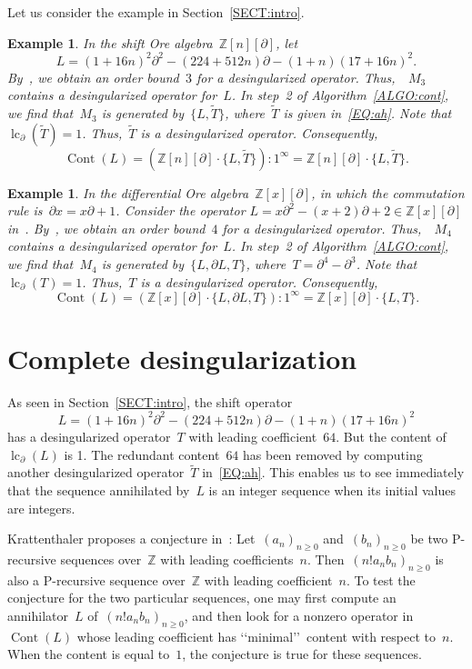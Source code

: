 \documentclass{sig-alternate}
\newcommand{\bZ} { {\mathbb{Z}}}
\newcommand{\cont}{\operatorname{Cont}}
\newcommand{\lc}{\operatorname{lc}}
\newcommand{\pa}{\partial}
\newtheorem{example}[theorem]{Example}
\begin{document}
Let us consider the example in Section~\ref{SECT:intro}.
\begin{example} \label{EX:ah}
In the shift Ore algebra~$\bZ[n][\pa]$, let
\[
 L = (1 + 16 n)^2 \pa^2 - (224 + 512 n) \pa - (1 + n)(17 + 16 n)^2.
\]
By~\cite[Lemma 4]{Chen2013}, we obtain an order bound~$3$ for a desingularized operator. Thus,~~$M_3$ contains a desingularized operator for~$L$.
In step~2 of  Algorithm~\ref{ALGO:cont}, we find that~$M_3$ is generated by~$\{L, \tilde{T} \}$, where~$\tilde T$ is given in~\eqref{EQ:ah}.
Note that~$\lc_{\pa}(\tilde{T}) {=} 1$. Thus,~$\tilde T$ is a desingularized operator.
Consequently,
$$\cont(L) = (\bZ[n][\pa] \cdot \{L, \tilde{T} \}   ) : 1^{\infty} = \bZ[n][\pa] \cdot \{L, \tilde{T} \}.$$
\end{example}

\begin{example} \label{EX:bm}
In the differential Ore algebra~$\bZ[x][\pa]$, in which the commutation rule is~$\pa x = x \pa + 1$.
Consider the operator
$L = x \pa^2 - (x + 2) \pa + 2 \in \bZ[x][\pa]$ in~\cite{Barkatou2015}.
By~\cite[Algorithm 3.4]{Tsai2000}, we obtain an order bound~$4$ for a desingularized operator. Thus,~~$M_4$ contains a desingularized operator for~$L$.
In step~2 of  Algorithm~\ref{ALGO:cont}, we find that~$M_4$ is generated by~$\{L, \pa L, T \}$, where~$T = \pa^4 - \pa^3$.
Note that~$\lc_{\pa}(T) = 1$. Thus,~$T$ is a desingularized operator.
Consequently,
$$\cont(L) = (\bZ[x][\pa] \cdot \{L, \pa L, T \}   ) : 1^{\infty} = \bZ[x][\pa] \cdot \{L, T \}.$$
\end{example}

\section{Complete desingularization} \label{SECT:cd}
As seen in Section~\ref{SECT:intro}, the shift operator
\[ L = (1 + 16 n)^2 \pa^2 - (224 + 512 n) \pa - (1 + n)(17 + 16 n)^2 \]
has a desingularized operator~$T$ with leading coefficient~$64$.  But the content of~$\lc_\pa(L)$ is 1. The redundant content~$64$ has been removed by computing another desingularized operator~$\tilde{T}$ in~\eqref{EQ:ah}. This enables us to see immediately that the sequence annihilated by~$L$ is an
integer sequence when its initial values are integers.

Krattenthaler proposes a conjecture in~\cite{George2015}: Let~$(a_n)_{n \ge 0}$ and~$(b_n)_{n \ge 0}$ be two P-recursive sequences
over~$\bZ$ with leading coefficients~$n$. Then~$(n! a_n b_n)_{n \ge 0}$
is also a P-recursive sequence over~$\bZ$ with leading
coefficient~$n$. To test the conjecture for the two particular sequences, one may first compute an annihilator~$L$ of~$(n! a_n b_n)_{n \ge 0}$,
and then look for a nonzero operator in~$\cont(L)$ whose leading coefficient has \lq\lq minimal\rq\rq~content with respect to~$n$. When the content is equal to~$1$, the conjecture is true for these
sequences.
\end{document}
